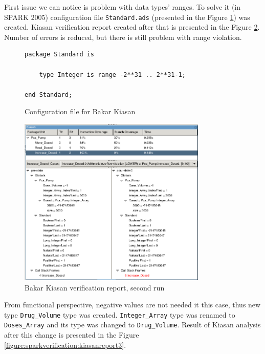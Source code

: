 First issue we can notice is problem with data types' ranges. To solve it (in SPARK 2005) configuration file \lstinline{Standard.ads} (presented in the Figure \ref{figure:sparkverification:config}) was created. Kiasan verification report created after that is presented in the Figure \ref{figure:sparkverification:kiasanreport2}. Number of errors is reduced, but there is still problem with range violation.

\begin{figure}
\singlespacing
\begin{lstlisting}[frame=single, gobble=0]
package Standard is

    type Integer is range -2**31 .. 2**31-1;

end Standard;
\end{lstlisting}
\doublespacing
\caption{Configuration file for Bakar Kiasan}
\label{figure:sparkverification:config}
\end{figure}

\begin{figure}[ht]%
    \begin{center}
        \includegraphics[width=0.8\textwidth]{figures/pca-pump-verification-step2.png}        
    \end{center}
    \caption{Bakar Kiasan verification report, second run}
    \label{figure:sparkverification:kiasanreport2}
\end{figure}

From functional perspective, negative values are not needed it this case, thus new type \lstinline{Drug_Volume} type was created. \lstinline{Integer_Array} type was renamed to \lstinline{Doses_Array} and its type was changed to \lstinline{Drug_Volume}. Result of Kiasan analysis after this change is presented in the Figure \ref{figure:sparkverification:kiasanreport3}.

